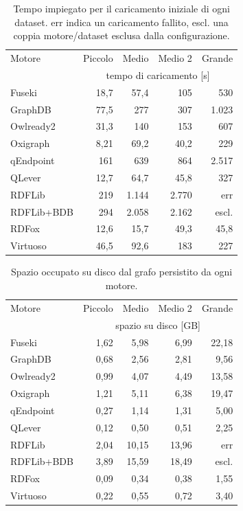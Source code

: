 
\begin{table}[H]
\centering
\begin{small}
\begin{tabular}{lrrrr}
\toprule
Motore & Piccolo & Medio & Medio 2 & Grande \\
 & \multicolumn{4}{c}{tempo di caricamento [s]} \\
\midrule
Fuseki & 18,7 & 57,4 & 105 & 530 \\
GraphDB & 77,5 & 277 & 307 & 1.023 \\
Owlready2 & 31,3 & 140 & 153 & 607 \\
Oxigraph & 8,21 & 69,2 & 40,2 & 229 \\
qEndpoint & 161 & 639 & 864 & 2.517 \\
QLever & 12,7 & 64,7 & 45,8 & 327 \\
RDFLib & 219 & 1.144 & 2.770 & \textsf{err} \\
RDFLib+BDB & 294 & 2.058 & 2.162 & \textsf{escl.} \\
RDFox & 12,6 & 15,7 & 49,3 & 45,8 \\
Virtuoso & 46,5 & 92,6 & 183 & 227 \\
\bottomrule
\end{tabular}
\end{small}
\caption{Tempo impiegato per il caricamento iniziale di ogni dataset. \textsf{err} indica un caricamento fallito, \textsf{escl.} una coppia motore/dataset esclusa dalla configurazione.}
\label{tab:load_time}
\end{table}

\begin{table}[H]
\centering
\begin{small}
\begin{tabular}{lrrrr}
\toprule
Motore & Piccolo & Medio & Medio 2 & Grande \\
 & \multicolumn{4}{c}{spazio su disco [GB]} \\
\midrule
Fuseki & 1,62 & 5,98 & 6,99 & 22,18 \\
GraphDB & 0,68 & 2,56 & 2,81 & 9,56 \\
Owlready2 & 0,99 & 4,07 & 4,49 & 13,58 \\
Oxigraph & 1,21 & 5,11 & 6,38 & 19,47 \\
qEndpoint & 0,27 & 1,14 & 1,31 & 5,00 \\
QLever & 0,12 & 0,50 & 0,51 & 2,25 \\
RDFLib & 2,04 & 10,15 & 13,96 & \textsf{err} \\
RDFLib+BDB & 3,89 & 15,59 & 18,49 & \textsf{escl.} \\
RDFox & 0,09 & 0,34 & 0,38 & 1,55 \\
Virtuoso & 0,22 & 0,55 & 0,72 & 3,40 \\
\bottomrule
\end{tabular}
\end{small}
\caption{Spazio occupato su disco dal grafo persistito da ogni motore.}
\label{tab:disk_size}
\end{table}

